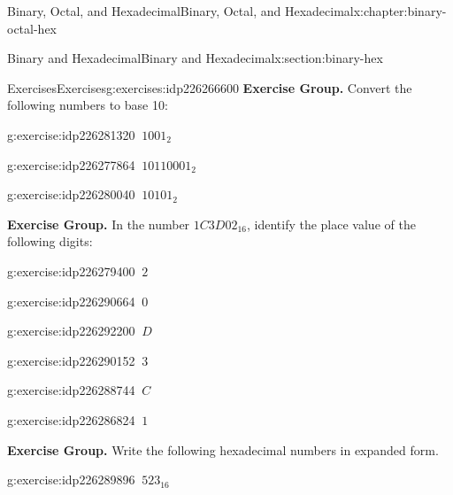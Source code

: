\documentclass[twoside,10pt,]{book}
\numberwithin{equation}{section}
\begin{document}
\begin{chapterptx}{Binary, Octal, and Hexadecimal}{}{Binary, Octal, and Hexadecimal}{}{}{x:chapter:binary-octal-hex}
\begin{sectionptx}{Binary and Hexadecimal}{}{Binary and Hexadecimal}{}{}{x:section:binary-hex}
\begin{exercises-subsection}{Exercises}{}{Exercises}{}{}{g:exercises:idp226266600}
\textbf{Exercise Group.}\space\space%
Convert the following numbers to base 10:%
\begin{exercisegroup}
\begin{divisionexerciseeg}{10}{}{}{g:exercise:idp226281320}%
\(\ 1001_2\)\end{divisionexerciseeg}%
\begin{divisionexerciseeg}{11}{}{}{g:exercise:idp226277864}%
\(\ 10110001_2\)\end{divisionexerciseeg}%
\begin{divisionexerciseeg}{12}{}{}{g:exercise:idp226280040}%
\(\ 10101_2\)\end{divisionexerciseeg}%
\end{exercisegroup}
\par\medskip\noindent
\par\medskip\noindent%
\textbf{Exercise Group.}\space\space%
In the number \(1C3D02_{16}\), identify the place value of the following digits:%
\begin{exercisegroup}
\begin{divisionexerciseeg}{13}{}{}{g:exercise:idp226279400}%
\(\ 2\)\end{divisionexerciseeg}%
\begin{divisionexerciseeg}{14}{}{}{g:exercise:idp226290664}%
\(\ 0\)\end{divisionexerciseeg}%
\begin{divisionexerciseeg}{15}{}{}{g:exercise:idp226292200}%
\(\ D\)\end{divisionexerciseeg}%
\begin{divisionexerciseeg}{16}{}{}{g:exercise:idp226290152}%
\(\ 3\)\end{divisionexerciseeg}%
\begin{divisionexerciseeg}{17}{}{}{g:exercise:idp226288744}%
\(\ C\)\end{divisionexerciseeg}%
\begin{divisionexerciseeg}{18}{}{}{g:exercise:idp226286824}%
\(\ 1\)\end{divisionexerciseeg}%
\end{exercisegroup}
\par\medskip\noindent
\par\medskip\noindent%
\textbf{Exercise Group.}\space\space%
Write the following hexadecimal numbers in expanded form.%
\begin{exercisegroup}
\begin{divisionexerciseeg}{19}{}{}{g:exercise:idp226289896}%
\(\ 523_{16}\)\end{divisionexerciseeg}%

\end{exercisegroup}
\end{exercises-subsection}
\end{sectionptx}
\end{chapterptx}
\end{document}
